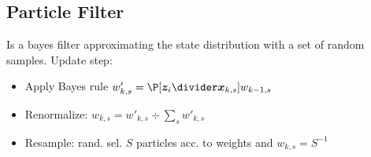 \subsection{Particle Filter}
Is a bayes filter approximating the state distribution with a set of random samples.
Update step:
\begin{itemize}
    \item Apply Bayes rule $w'_{k, s} = \P[\vec{z}_i \divider \vec{x}_{k, s}] w_{k - 1, s}$
    \item Renormalize: $w_{k, s} = w'_{k, s} \div \sum_{s} w'_{k, s}$
    \item Resample: rand. sel. $S$ particles acc. to weights and $w_{k, s} = S^{-1}$
\end{itemize}
